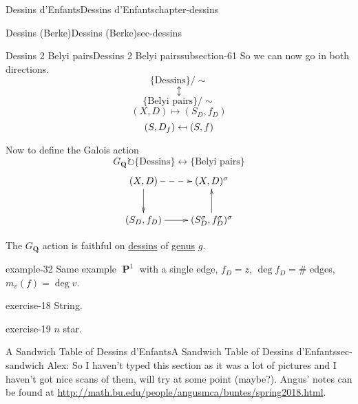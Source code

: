 \documentclass[oneside,10pt,]{book}
\numberwithin{equation}{section}
\providecommand\mapsfrom{\mathrel{\reflectbox{\ensuremath{\mapsto}}}}
\newcommand{\QQ}{\mathbf{Q}}
\newcommand{\acts}{\circlearrowright}
\DeclareMathOperator{\PP}{\mathbf{P}}
\begin{document}
\begin{chapterptx}{Dessins d'Enfants}{}{Dessins d'Enfants}{}{}{chapter-dessins}
\begin{sectionptx}{Dessins (Berke)}{}{Dessins (Berke)}{}{}{sec-dessins}
\begin{subsectionptx}{Dessins 2 Belyi pairs}{}{Dessins 2 Belyi pairs}{}{}{subsection-61}
\hypertarget{p-658}{}%
So we can now go in both directions.%
\begin{equation*}
\{\text{Dessins}\}/\sim
\end{equation*}
%
\begin{equation*}
\updownarrow
\end{equation*}
%
\begin{equation*}
\{\text{Belyi pairs}\}/\sim
\end{equation*}
%
\begin{equation*}
(X,D) \mapsto (S_D, f_D)
\end{equation*}
%
\begin{equation*}
(S, D_f) \mapsfrom (S,f)
\end{equation*}
%
\par
\hypertarget{p-659}{}%
Now to define the Galois action%
\begin{equation*}
G_\QQ\acts \{\text{Dessins}\}\leftrightarrow \{\text{Belyi pairs}\}
\end{equation*}
%
\begin{equation*}
\xymatrix{
(X,D)\ar[d] \ar@{-->}[r] & (X,D)^\sigma \\
(S_D,f_D)\ar[r] & (S_D^\sigma,f_D^\sigma)^\sigma \ar[u]
}
\end{equation*}
%
\par
\hypertarget{p-660}{}%
The \(G_\QQ\) action is faithful on \hyperref[def-dessin-denfant]{dessins} of \hyperref[def-class-set]{genus} \(g\).%
\begin{example}{}{example-32}%
\hypertarget{p-661}{}%
Same example \(\PP^1\) with a single edge, \(f_D  = z\), \(\deg f_D = \#\) edges, \(m_v(f)=  \deg v\).%
\end{example}
\begin{inlineexercise}{}{exercise-18}%
\hypertarget{p-662}{}%
String.%
\end{inlineexercise}
\begin{inlineexercise}{}{exercise-19}%
\hypertarget{p-663}{}%
\(n\) star.%
\end{inlineexercise}
\end{subsectionptx}
\end{sectionptx}
%
%
\typeout{************************************************}
\typeout{************************************************}
%
\begin{sectionptx}{A Sandwich Table of Dessins d'Enfants}{}{A Sandwich Table of Dessins d'Enfants}{}{}{sec-sandwich}
\hypertarget{p-664}{}%
Alex: So I haven't typed this section as it was a lot of pictures and I haven't got nice scans of them, will try at some point (maybe?). Angus' notes can be found at \url{http://math.bu.edu/people/angusmca/buntes/spring2018.html}.%

\end{sectionptx}
\end{chapterptx}
\end{document}
